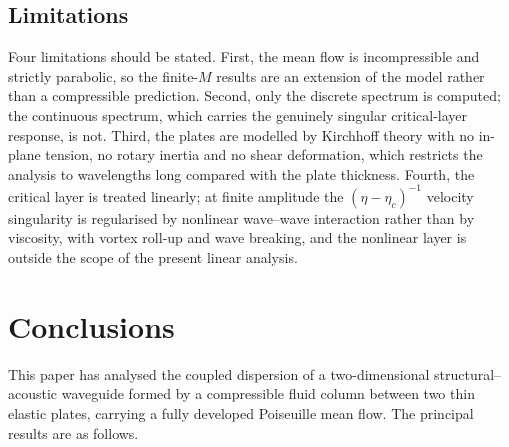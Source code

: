 \documentclass[11pt,a4paper]{article}
\theoremstyle{plain}
\theoremstyle{remark}
\begin{document}
\subsection{Limitations}
Four limitations should be stated. First, the mean flow is incompressible and strictly parabolic, so
the finite-$M$ results are an extension of the model rather than a compressible prediction. Second,
only the discrete spectrum is computed; the continuous spectrum, which carries the genuinely singular
critical-layer response, is not. Third, the plates are modelled by Kirchhoff theory with no in-plane
tension, no rotary inertia and no shear deformation, which restricts the analysis to wavelengths long
compared with the plate thickness. Fourth, the critical layer is treated linearly; at finite amplitude
the $(\eta-\eta_c)^{-1}$ velocity singularity is regularised by nonlinear wave--wave interaction rather
than by viscosity, with vortex roll-up and wave breaking, and the nonlinear layer is outside the scope
of the present linear analysis.

\section{Conclusions}\label{sec:concl}

This paper has analysed the coupled dispersion of a two-dimensional structural--acoustic waveguide
formed by a compressible fluid column between two thin elastic plates, carrying a fully developed
Poiseuille mean flow. The principal results are as follows.
\end{document}
